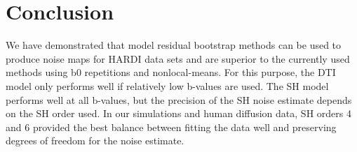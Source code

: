 \section{Conclusion}

We have demonstrated that model residual bootstrap methods can be used
to produce noise maps for HARDI data sets and are superior to the
currently used methods using b0 repetitions and nonlocal-means. For this
purpose, the DTI model only performs well if relatively low b-values are
used. The SH model performs well at all b-values, but the precision of
the SH noise estimate depends on the SH order used. In our simulations
and human diffusion data, SH orders 4 and 6 provided the best balance
between fitting the data well and preserving degrees of freedom for the
noise estimate.
